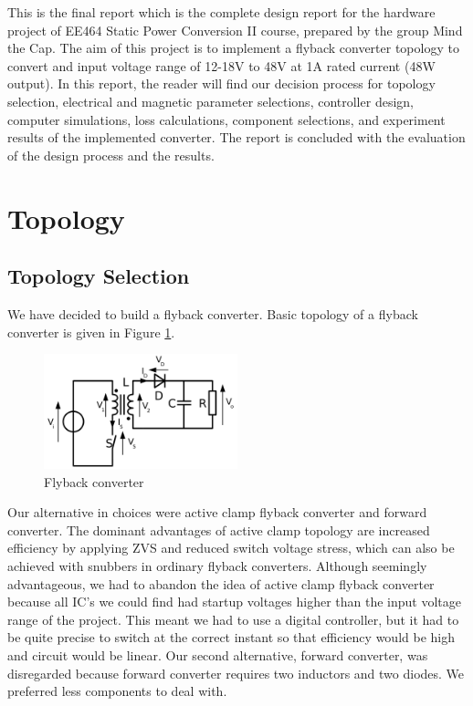 \documentclass[12pt]{article}
\begin{document}
This is the final report which is the complete design report for the hardware project of EE464 Static Power Conversion II course, prepared by the group Mind the Cap. The aim of this project is to implement a flyback converter topology to convert and input voltage range of 12-18V to 48V at 1A rated current (48W output). In this report, the reader will find our decision process for topology selection, electrical and magnetic parameter selections, controller design, computer simulations, loss calculations, component selections, and experiment results of the implemented converter. The report is concluded with the evaluation of the design process and the results.


\newpage
\section{Topology}

    \subsection{Topology Selection}
    We have decided to build a flyback converter. Basic topology of a flyback converter is given in Figure \ref{fig:flyback}.

    \begin{figure}[H]
        \centering
        \includegraphics[width = 0.5\textwidth]{img/flyback.png}
        \caption{Flyback converter}
        \label{fig:flyback}
    \end{figure}

    Our alternative in choices were active clamp flyback converter and forward converter. The dominant advantages of active clamp topology are increased efficiency by applying ZVS and reduced switch voltage stress, which can also be achieved with snubbers in ordinary flyback converters. Although seemingly advantageous, we had to abandon the idea of active clamp flyback converter because all IC's we could find had startup voltages higher than the input voltage range of the project. This meant we had to use a digital controller, but it had to be quite precise to switch at the correct instant so that efficiency would be high and circuit would be linear. Our second alternative, forward converter, was disregarded because forward converter requires two inductors and two diodes. We preferred less components to deal with.
\end{document}
